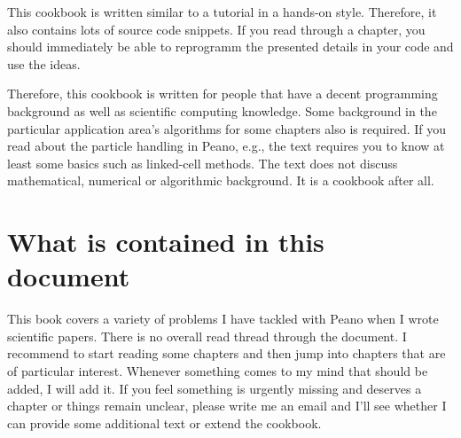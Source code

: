 This cookbook is written similar to a tutorial in a hands-on style.
Therefore, it also contains lots of source code snippets.
If you read through a chapter, you should immediately be able to reprogramm the
presented details in your code and use the ideas.

Therefore, this cookbook is written for people that have a decent programming
background as well as scientific computing knowledge.
Some background in the particular application area's algorithms for some
chapters also is required. 
If you read about the particle handling in Peano, e.g., the text requires you to
know at least some basics such as linked-cell methods.
The text does not discuss mathematical, numerical or algorithmic background.
It is a cookbook after all.


\section*{What is contained in this document}

This book covers a variety of problems I have tackled with Peano when I wrote
scientific papers.
There is no overall read thread through the document.
I recommend to start reading some chapters and then jump into chapters
that are of particular interest.
Whenever something comes to my mind that should be added, I will add it.
If you feel something is urgently missing and deserves a chapter or things
remain unclear, please write me an email and I'll see whether I can provide some
additional text or extend the cookbook.



 